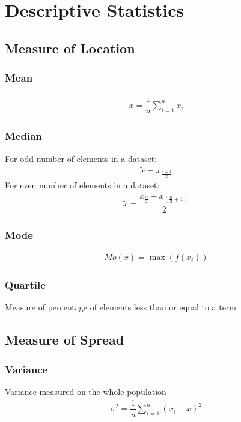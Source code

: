 \chapter{Descriptive Statistics}
\section{Measure of Location}
\subsection{Mean}
\begin{align}
	\bar{x} = \dfrac{1}{n} \displaystyle\sum_{i=1}^{n} x_i
\end{align}

\subsection{Median}
For odd number of elements in a dataset:
\begin{align}
	\tilde{x} = x_{\frac{n+1}{2}}
\end{align}
For even number of elements in a dataset:
\begin{align}
	\tilde{x} = \dfrac{x_{\frac{n}{2}}+x_{\left(\frac{n}{2}+1\right)}}{2}
\end{align}

\subsection{Mode}
\begin{align}
	Mo(x) = \max(f(x_i))
\end{align}

\subsection{Quartile}
Measure of percentage of elements less than or equal to a term


\section{Measure of Spread}
\subsection{Variance}
Variance measured on the whole population
\begin{align}
	\sigma^2 = \dfrac{1}{n} \sum_{i=1}^{n} \left( x_i - \bar{x} \right)^2
\end{align}

